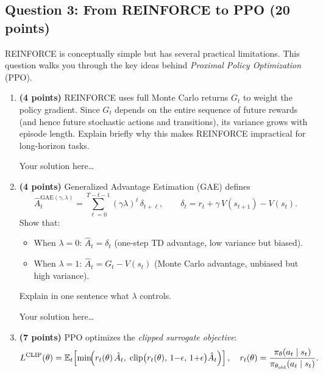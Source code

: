 \documentclass[11pt]{article}
\begin{document}
\subsection*{Question 3: From REINFORCE to PPO (20 points)}

REINFORCE is conceptually simple but has several practical limitations.
This question walks you through the key ideas behind
\emph{Proximal Policy Optimization} (PPO).

\begin{enumerate}[label=(\alph*)]
\item \textbf{(4 points)} REINFORCE uses full Monte Carlo returns $G_t$
to weight the policy gradient.  Since $G_t$ depends on the entire sequence
of future rewards (and hence future stochastic actions and transitions),
its variance grows with episode length.  Explain briefly why this makes
REINFORCE impractical for long-horizon tasks.

\begin{solution}
Your solution here\ldots
\end{solution}

\item \textbf{(4 points)} Generalized Advantage Estimation (GAE) defines
\[
  \hat{A}_t^{\text{GAE}(\gamma,\lambda)}
  = \sum_{\ell=0}^{T-t-1}(\gamma\lambda)^\ell\,\delta_{t+\ell},
  \qquad
  \delta_t = r_t + \gamma\,V(s_{t+1}) - V(s_t).
\]
Show that:
\begin{itemize}
  \item When $\lambda=0$: $\hat{A}_t = \delta_t$
        (one-step TD advantage, low variance but biased).
  \item When $\lambda=1$: $\hat{A}_t = G_t - V(s_t)$
        (Monte Carlo advantage, unbiased but high variance).
\end{itemize}
Explain in one sentence what $\lambda$ controls.

\begin{solution}
Your solution here\ldots
\end{solution}

\item \textbf{(7 points)} PPO optimizes the \emph{clipped surrogate
objective}:
\[
  L^{\text{CLIP}}(\theta) = \mathbb{E}_t\!\left[\min\!\Bigl(
    r_t(\theta)\,\hat{A}_t,\;
    \text{clip}\bigl(r_t(\theta),\,1{-}\epsilon,\,1{+}\epsilon\bigr)
    \hat{A}_t
  \Bigr)\right],
  \quad
  r_t(\theta) = \frac{\pi_\theta(a_t\mid s_t)}
                      {\pi_{\theta_{\text{old}}}(a_t\mid s_t)}.
\]


\end{enumerate}
\end{document}

